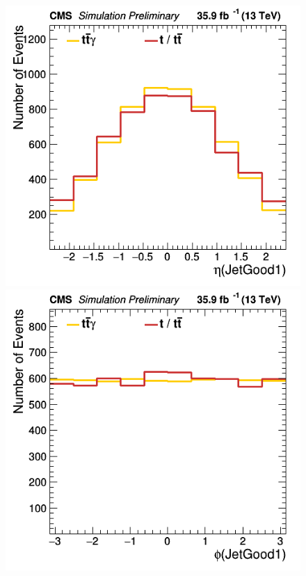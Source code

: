 \documentclass[11pt]{scrartcl}
\begin{document}
	\begin{figure}[H]
	\centering
	\begin{minipage}{.5\textwidth}
	  \centering
	  \includegraphics[width=0.7\linewidth]{figures/Notused/JetGood1_eta.png}
	\end{minipage}%
	\begin{minipage}{.5\textwidth}
	  \centering
	  \includegraphics[width=0.7\linewidth]{figures/Notused/JetGood1_phi.png}
	\end{minipage}
	\end{figure}
	
\end{document}
